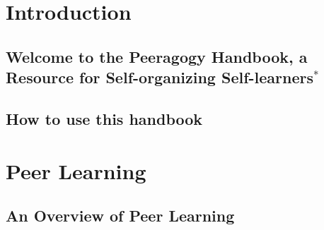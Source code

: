 \documentclass[ebook, 12pt, twoside]{memoir}
\begin{document}
\cleardoublepage

\frontmatter
\tableofcontents*
\pagestyle{empty}

\mainmatter

\part{Introduction} %
\pagestyle{companion}
\chapter[\textbf{Welcome!}]{Welcome to the Peeragogy Handbook, a Resource for Self-organizing Self-learners$^*$}
%

%
\chapter[\textbf{How to use this handbook}]{How to use this handbook}
%

%
\part{Peer Learning} %
%
\chapter[\textbf{An Overview}]{An Overview of Peer Learning}

%
\end{document}

